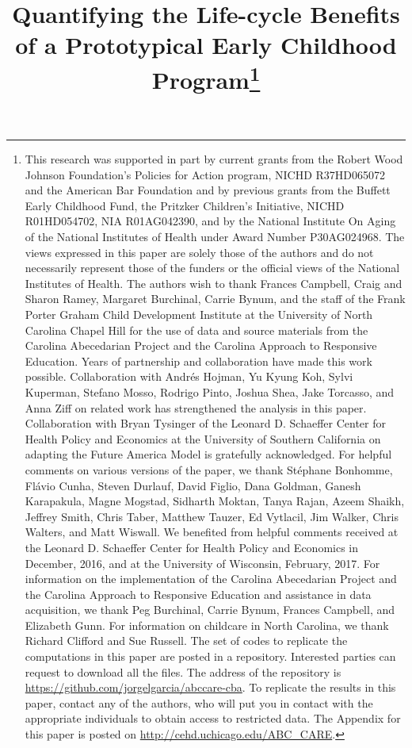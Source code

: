 \begin{titlepage}
\title{\Large \textbf{Quantifying the Life-cycle Benefits \\ of a Prototypical Early Childhood Program}\thanks{This research was supported in part by current grants from the Robert Wood Johnson Foundation's Policies for Action program, NICHD R37HD065072 and the American Bar Foundation and by previous grants from the Buffett Early Childhood Fund, the Pritzker Children's Initiative, NICHD R01HD054702, NIA R01AG042390, and by the National Institute On Aging of the National Institutes of Health under Award Number P30AG024968. The views expressed in this paper are solely those of the authors and do not necessarily represent those of the funders or the official views of the National Institutes of Health. The authors wish to thank Frances Campbell, Craig and Sharon Ramey, Margaret Burchinal, Carrie Bynum, and the staff of the Frank Porter Graham Child Development Institute at the University of North Carolina Chapel Hill for the use of data and source materials from the Carolina Abecedarian Project and the Carolina Approach to Responsive Education. Years of partnership and collaboration have made this work possible. Collaboration with Andr\'{e}s Hojman, Yu Kyung Koh, Sylvi Kuperman, Stefano Mosso, Rodrigo Pinto, Joshua Shea, Jake Torcasso, and Anna Ziff on related work has strengthened the analysis in this paper. Collaboration with Bryan Tysinger of the Leonard D. Schaeffer Center for Health Policy and Economics at the University of Southern California on adapting the Future America Model is gratefully acknowledged. For helpful comments on various versions of the paper, we thank St\'{e}phane Bonhomme, Fl\'{a}vio Cunha, Steven Durlauf, David Figlio, Dana Goldman, Ganesh Karapakula, Magne Mogstad, Sidharth Moktan, Tanya Rajan, Azeem Shaikh, Jeffrey Smith, Chris Taber, Matthew Tauzer, Ed Vytlacil, Jim Walker, Chris Walters, and Matt Wiswall. We benefited from helpful comments received at the Leonard D. Schaeffer Center for Health Policy and Economics in December, 2016, and at the University of Wisconsin, February, 2017. For information on the implementation of the Carolina Abecedarian Project and the Carolina Approach to Responsive Education and assistance in data acquisition, we thank Peg Burchinal, Carrie Bynum, Frances Campbell, and Elizabeth Gunn. For information on childcare in North Carolina, we thank Richard Clifford and Sue Russell. The set of codes to replicate the computations in this paper are posted in a repository. Interested parties can request to download all the files. The address of the repository is \url{https://github.com/jorgelgarcia/abccare-cba}. To replicate the results in this paper, contact any of the authors, who will put you in contact with the appropriate individuals to obtain access to restricted data. The Appendix for this paper is posted on \url{http://cehd.uchicago.edu/ABC_CARE}.}}


\end{titlepage}
